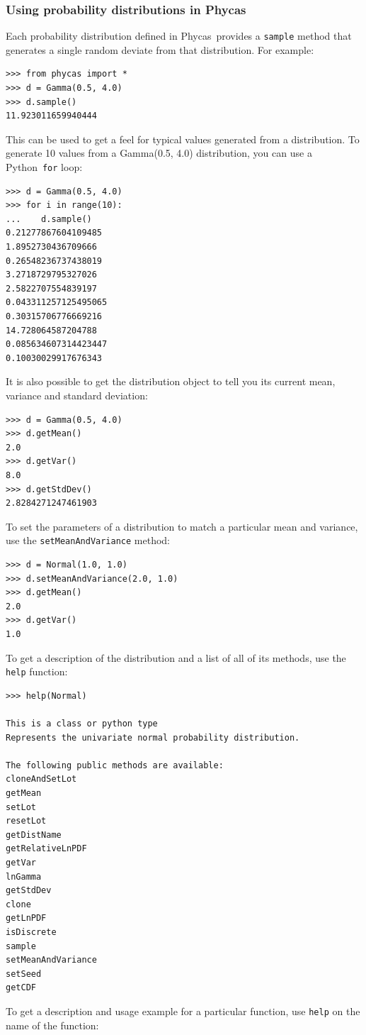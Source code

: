 \documentclass[10pt]{article}
\newcommand{\code}[1]{{\tt #1}}					%
\newcommand{\cmd}[1]{{\tt \small #1}\index{#1}}	%
\newcommand{\python}{{\sc Python}\index{Python}}
\newcommand{\phycas}{{\sc Phycas}\index{Phycas}}
\begin{document}
\subsubsection{Using probability distributions in \phycas}
Each probability distribution defined in \phycas\ provides a \code{sample} method that generates a single random deviate from that distribution. For example:
%
\begin{verbatim}
>>> from phycas import *
>>> d = Gamma(0.5, 4.0)
>>> d.sample()
11.923011659940444
\end{verbatim}
%
This can be used to get a feel for typical values generated from a distribution. To generate 10 values from a Gamma(0.5, 4.0) distribution, you can use a \python\ \cmd{for} loop:
%
\begin{verbatim}
>>> d = Gamma(0.5, 4.0)
>>> for i in range(10):
...    d.sample()
0.21277867604109485
1.8952730436709666
0.26548236737438019
3.2718729795327026
2.5822707554839197
0.043311257125495065
0.30315706776669216
14.728064587204788
0.085634607314423447
0.10030029917676343
\end{verbatim}
%
It is also possible to get the distribution object to tell you its current mean, variance and standard deviation:
%
\begin{verbatim}
>>> d = Gamma(0.5, 4.0)
>>> d.getMean()
2.0
>>> d.getVar()
8.0
>>> d.getStdDev()
2.8284271247461903
\end{verbatim}
%
To set the parameters of a distribution to match a particular mean and variance, use the \code{setMeanAndVariance} method:
%
\begin{verbatim}
>>> d = Normal(1.0, 1.0)
>>> d.setMeanAndVariance(2.0, 1.0)
>>> d.getMean()
2.0
>>> d.getVar()
1.0
\end{verbatim}
%
To get a description of the distribution and a list of all of its methods, use the \code{help} function:
%
\begin{verbatim}
>>> help(Normal)

This is a class or python type
Represents the univariate normal probability distribution.

The following public methods are available:
cloneAndSetLot
getMean
setLot
resetLot
getDistName
getRelativeLnPDF
getVar
lnGamma
getStdDev
clone
getLnPDF
isDiscrete
sample
setMeanAndVariance
setSeed
getCDF
\end{verbatim}
%
To get a description and usage example for a particular function, use \code{help} on the name of the function:
%
\end{document}
